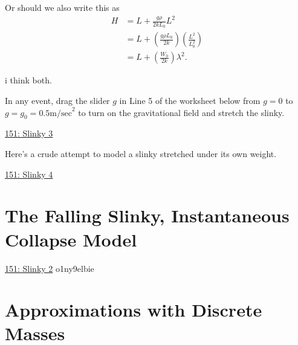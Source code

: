 \documentclass{ximera}
\begin{document}
Or should we also write this as
\begin{align*}
        H  & = L + \frac{g\rho}{2kL_0}L^2 \\
            & =  L + \left( \frac{g\rho L_0}{2k} \right) \left( \frac{L^2}{L_0^2} \right) \\
            & = L + \left( \frac{W_0}{2k} \right) \lambda^2 .
\end{align*}

i think both.

In any event, drag the slider $g$ in Line 5 of the worksheet below from $g=0$ to $g=g_0 = 0.5 \text{m/sec}^2$ to turn on the gravitational field and stretch the slinky. 

\begin{onlineOnly}
    \begin{center}
\end{center}
\end{onlineOnly}

\href{https://www.desmos.com/calculator/vjjibjkdrz}{151: Slinky 3}

Here's a crude attempt to model a slinky stretched under its own weight.

\begin{onlineOnly}
    \begin{center}
\end{center}
\end{onlineOnly}

\href{https://www.desmos.com/calculator/o1ny9elbie}{151: Slinky 4}


\section{The Falling Slinky, Instantaneous Collapse Model}




\begin{onlineOnly}
    \begin{center}
\end{center}
\end{onlineOnly}

\href{https://www.desmos.com/calculator/fahf3t461i}{151: Slinky 2}
o1ny9elbie


\section{Approximations with Discrete Masses}
\end{document}
